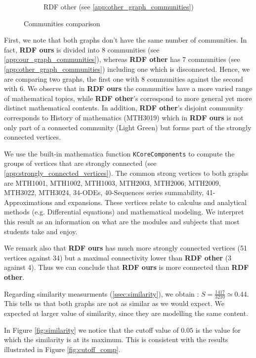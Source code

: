 \documentclass[english, 12pt]{article}
\begin{document}
\begin{figure}
\begin{subfigure}[b]{0.35\textwidth}
        \caption{RDF other (see \ref{app:other_graph_communities})}
    \end{subfigure}
    \vspace{.5cm}
    \caption{Communities comparison}
    \label{fig:communities_comp}
\end{figure}

First, we note that both graphs don't have the same number of communities. In fact, {\bf RDF ours} is divided into 8 communities (see \ref{app:our_graph_communities}), whereas {\bf RDF other} has 7 communities (see \ref{app:other_graph_communities}) including one which is disconnected. Hence, we are comparing two graphs, the first one with 8 communities against the second with 6. We observe that in {\bf RDF ours} the communities have a more varied range of mathematical topics, while {\bf RDF other}'s correspond to more general yet more distinct mathematical contents.
In addition, {\bf RDF other}'s disjoint community corresponds to History of mathematics (MTH3019) which in {\bf RDF ours} is not only part of a connected community (Light Green) but forms part of the strongly connected vertices.

We use the built-in mathematica function \texttt{KCoreComponents} to compute the groups of vertices that are strongly connected (see \ref{app:strongly_connected_vertices}). The common strong vertices to both graphs are MTH1001, MTH1002, MTH1003, MTH2003, MTH2006, MTH2009, MTH3022, MTH3024, 34-ODEs, 40-Sequences series summability, 41-Approximations and expansions. These vertices relate to calculus and analytical methods (e.g. Differential equations) and mathematical modeling.
We interpret this result as an information on what are the modules and subjects that most students take and enjoy. 

We remark also that {\bf RDF ours} has much more strongly connected vertices (51 vertices against 34) but a maximal connectivity lower than {\bf RDF other} (3 against 4). Thus we can conclude that {\bf RDF ours} is more connected than {\bf RDF other}.

Regarding similarity measurments (\ref{ssec:similarity}), we obtain : $S = \frac{1417}{3210} \simeq0.44$.
This tells us that both graphs are not as similar as we would expect. We expected at larger value of similarity, since they are modelling the same content.


In Figure \ref{fig:similarity} we notice that the cutoff value of $0.05$ is the value for which the similarity is at its maximum. This is consistent with the results illustrated in  Figure \ref{fig:cutoff_comp}.
\end{document}
